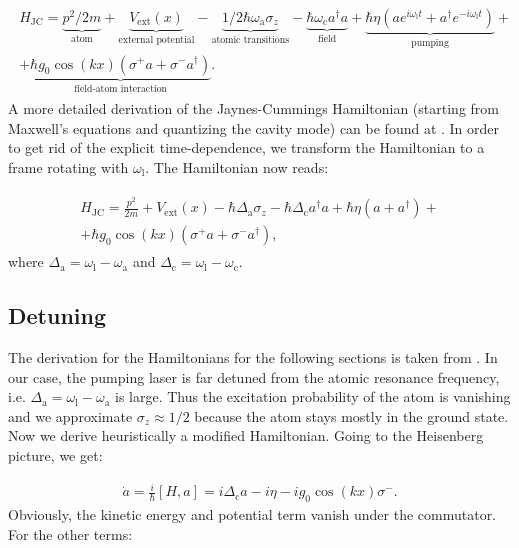 \begin{align}
\begin{split}
H_\text{JC} = \underbrace{p^2 / 2m}_\text{atom} + \underbrace{V_\text{ext}(x)}_\text{external potential} - \underbrace{1/2 \hbar \omega_\text{a} \sigma_z}_\text{atomic transitions} - \underbrace{\hbar \omega_\text{c} a^\dagger a}_\text{field} + \underbrace{\hbar \eta (a e^{i \omega_\text{l} t} + a^\dagger e^{-i \omega_\text{l} t})}_\text{pumping} + \\
+ \underbrace{\hbar g_0 \cos(kx) (\sigma^+ a + \sigma^- a^\dagger)}_\text{field-atom interaction}.
\end{split}
\end{align}A more detailed derivation of the Jaynes-Cummings Hamiltonian (starting from Maxwell's equations and quantizing the cavity mode) can be found at \cite{collapseandrevival}. In order to get rid of the explicit time-dependence, we transform the Hamiltonian to a frame rotating with $\omega_\text{l}$. The Hamiltonian now reads:

\begin{align}
\begin{split}
H_\text{JC} = \frac{p^2}{2m} + V_\text{ext}(x) - \hbar \Delta_\text{a} \sigma_z - \hbar \Delta_\text{c} a^\dagger a + \hbar \eta (a + a^\dagger) + \\
+ \hbar g_0 \cos(kx) (\sigma^+ a + \sigma^- a^\dagger),
\end{split}
\end{align}where $\Delta_\text{a} = \omega_\text{l} - \omega_\text{a}$ and $\Delta_\text{c} = \omega_\text{l} - \omega_\text{c}$.

\subsection{Detuning}
The derivation for the Hamiltonians for the following sections is taken from \cite{donner}. In our case, the pumping laser is far detuned from the atomic resonance frequency, i.e. $\Delta_\text{a} = \omega_\text{l} - \omega_\text{a}$ is large. Thus the excitation probability of the atom is vanishing and we approximate $\sigma_z \approx 1/2$ because the atom stays mostly in the ground state. Now we derive heuristically a modified Hamiltonian. Going to the Heisenberg picture, we get:

\begin{align}
\dot{a} = \frac{i}{\hbar} [H, a] = i \Delta_\text{c} a - i \eta -i g_0 \cos(kx) \sigma^-.
\label{a_dot}
\end{align}Obviously, the kinetic energy and potential term vanish under the commutator. For the other terms:

